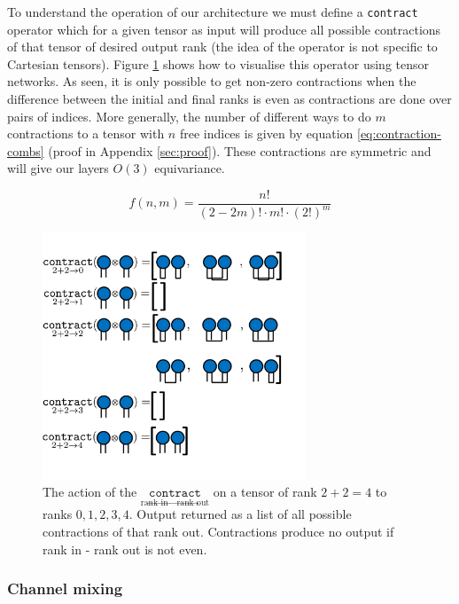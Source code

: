To understand the operation of our architecture we must define a \texttt{contract} operator which for a given tensor as input will produce all possible contractions of that tensor of desired output rank (the idea of the operator is not specific to Cartesian tensors). Figure \ref{fig:contraction-op} shows how to visualise this operator using tensor networks. As seen, it is only possible to get non-zero contractions when the difference between the initial and final ranks is even as contractions are done over pairs of indices. More generally, the number of different ways to do $m$ contractions to a tensor with $n$ free indices is given by equation \ref{eq:contraction-combs} (proof in Appendix \ref{sec:proof}). These contractions are symmetric and will give our layers $O(3)$ equivariance.

\begin{equation} \label{eq:contraction-combs}
    f(n,m) = \frac{n!}{(2-2m)! \cdot m! \cdot (2!)^m}
\end{equation}

\begin{figure}
    \centering
    \includegraphics[width=0.7\textwidth]{figures/contraction-op.png}
    \caption{The action of the $\underset{\text{rank in} \rightarrow \text{rank out}}{\texttt{contract}}$ on a tensor of rank $2+2=4$ to ranks $0,1,2,3,4$. Output returned as a list of all possible contractions of that rank out. Contractions produce no output if rank in - rank out is not even.}
    \label{fig:contraction-op}
\end{figure}

\subsubsection{Channel mixing}

